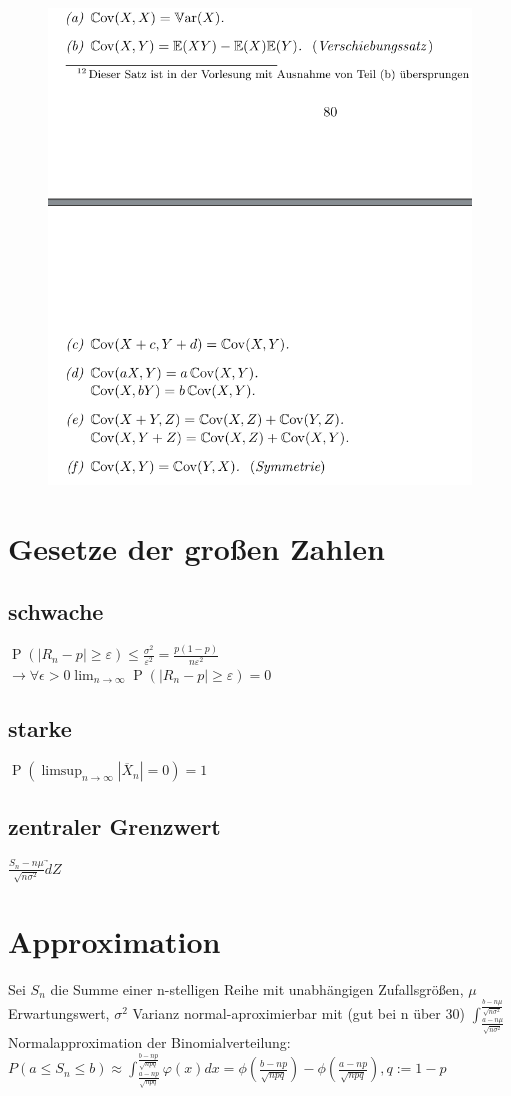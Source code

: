 \documentclass[]{article}
\begin{document}
\begin{figure}
	\centering
	\includegraphics[width=0.5\linewidth]{Rechenregelncovarianz}
	\label{fig:rechenregelncovarianz}
\end{figure}

\newpage
\section{Gesetze der großen Zahlen}
\subsection{schwache}
$\operatorname{P}\left(|R_n - p| \geq \varepsilon \right) \leq \frac{\sigma^2}{\varepsilon^2} = \frac{p(1-p)}{n \varepsilon^2}$  \\
$\rightarrow \forall \epsilon>0 \lim_{n \to \infty} \operatorname{P}\left(|R_n - p| \geq \varepsilon \right) = 0$
\subsection{starke}
$\operatorname{P}\left(\limsup_{n\rightarrow\infty}|\overline{X}_n|=0\right)=1$
\subsection{zentraler Grenzwert}
$\frac{S_n-n\mu}{\sqrt{n \sigma^2}} \underrightarrow{d} Z $
\section{Approximation}
Sei $S_n$ die Summe einer n-stelligen Reihe mit unabhängigen Zufallsgrößen, $\mu$ Erwartungswert, $\sigma^2$ Varianz
normal-aproximierbar mit  (gut bei n über 30) 
$\int_{\frac{a-n\mu}{\sqrt{n\sigma^2}}}^{\frac{b-n\mu}{\sqrt{n\sigma^2}}}$\\
Normalapproximation der Binomialverteilung: $P(a \leq S_n \leq b) \approx \int_{\frac{a-np}{\sqrt{npq}}}^{\frac{b-np}{\sqrt{npq}}} \varphi (x) dx = \phi(\frac{b-np}{\sqrt{npq}}) - \phi(\frac{a-np}{\sqrt{npq}}), q:=1-p $
\end{document}
